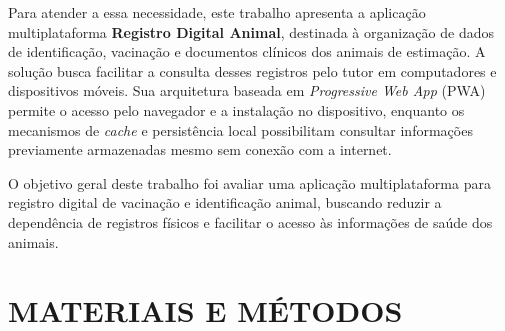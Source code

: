 \documentclass{UNESC}
\begin{document}
Para atender a essa necessidade, este trabalho apresenta a aplicação multiplataforma \textbf{Registro Digital Animal}, destinada à organização de dados de identificação, vacinação e documentos clínicos dos animais de estimação. A solução busca facilitar a consulta desses registros pelo tutor em computadores e dispositivos móveis. Sua arquitetura baseada em \textit{Progressive Web App} (PWA) permite o acesso pelo navegador e a instalação no dispositivo, enquanto os mecanismos de \textit{cache} e persistência local possibilitam consultar informações previamente armazenadas mesmo sem conexão com a internet.









O objetivo geral deste trabalho foi avaliar uma aplicação multiplataforma para registro digital de vacinação e identificação animal, buscando reduzir a dependência de registros físicos e facilitar o acesso às informações de saúde dos animais.






\section{MATERIAIS E MÉTODOS}
\end{document}
